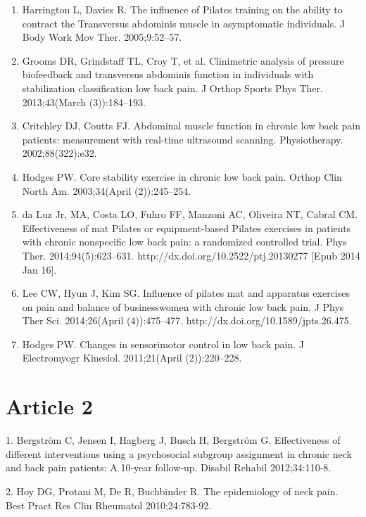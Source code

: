 \documentclass[a5paper]{article}
\theoremstyle{definition}
\begin{document}
\begin{enumerate}
\item
Harrington L, Davies R. The influence of Pilates training on the ability to contract the
Transversus abdominis muscle in asymptomatic individuals. J Body Work Mov Ther.
2005;9:52–57.



\item
Grooms DR, Grindstaff TL, Croy T, et al. Clinimetric analysis of pressure biofeedback
and transversus abdominis function in individuals with stabilization classification low
back pain. J Orthop Sports Phys Ther. 2013;43(March (3)):184–193.


\item
Critchley DJ, Coutts FJ. Abdominal muscle function in chronic low back pain patients:
measurement with real-time ultrasound scanning. Physiotherapy. 2002;88(322):e32.


\item
Hodges PW. Core stability exercise in chronic low back pain. Orthop Clin North Am.
2003;34(April (2)):245–254.

\item

da Luz Jr, MA, Costa LO, Fuhro FF, Manzoni AC, Oliveira NT, Cabral CM.
Effectiveness of mat Pilates or equipment-based Pilates exercises in patients with
chronic nonspecific low back pain: a randomized controlled trial. Phys Ther.
2014;94(5):623–631. http://dx.doi.org/10.2522/ptj.20130277 [Epub 2014 Jan 16].

\item

Lee CW, Hyun J, Kim SG. Influence of pilates mat and apparatus exercises on pain and
balance of businesswomen with chronic low back pain. J Phys Ther Sci. 2014;26(April
(4)):475–477. http://dx.doi.org/10.1589/jpts.26.475.

\item
Hodges PW. Changes in sensorimotor control in low back pain. J Electromyogr Kinesiol.
2011;21(April (2)):220–228.
\end{enumerate}
\section{Article 2}
1. Bergström C, Jensen I, Hagberg J, Busch H, Bergström G. Effectiveness
of different interventions using a psychosocial subgroup assignment
in chronic neck and back pain patients: A 10‑year follow‑up. Disabil
Rehabil 2012;34:110‑8.

2. Hoy DG, Protani M, De R, Buchbinder R. The epidemiology of neck
pain. Best Pract Res Clin Rheumatol 2010;24:783‑92.
\end{document}
